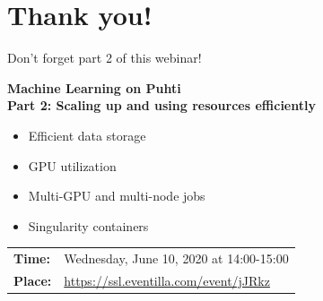 \documentclass[aspectratio=1610,14pt]{beamer}
\newcommand{\link}[1]{\alert{\url{#1}}}
\begin{document}







\section*{Thank you!}

\begin{frame}{Don't forget part 2 of this webinar!}

  \textbf{Machine Learning on Puhti \\
    Part 2: Scaling up and using resources efficiently}

  \begin{itemize}
  \item Efficient data storage
  \item GPU utilization
  \item Multi-GPU and multi-node jobs
  \item Singularity containers
  \end{itemize}

  \vfill

  \begin{tabular}{ll}
    \textbf{Time:}  & Wednesday, June 10, 2020 at 14:00-15:00 \\
    \textbf{Place:} & \link{https://ssl.eventilla.com/event/jJRkz} \\
  \end{tabular}

\end{frame}
\end{document}
